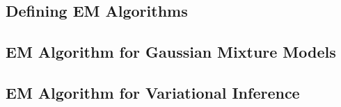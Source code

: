 \subsection{Defining EM Algorithms}
\subsection{EM Algorithm for Gaussian Mixture Models}
\subsection{EM Algorithm for Variational Inference}